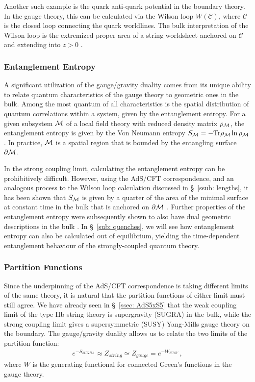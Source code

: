 \documentclass[../PhD.tex]{subfiles}
\begin{document}
Another such example is the quark anti-quark potential in the boundary theory. In the gauge theory, this can be calculated via the Wilson loop $W(\mathcal C)$, where $\mathcal C$ is the closed loop connecting the quark worldlines. The bulk interpretation of the Wilson loop is the extremized proper area of a string worldsheet anchored on $\mathcal C$ and extending into $z > 0$ \cite{hep-th/9803002}. 


\subsubsection*{Entanglement Entropy}
\label{ssub: EE}
A significant utilization of the gauge/gravity duality comes from its unique ability to relate quantum characteristics of the gauge theory to geometric ones in the bulk. Among the most quantum of all characteristics is the spatial distribution of quantum correlations within a system, given by the entanglement entropy. For a given subsystem $\mathcal M$ of a local field theory with reduced density matrix $\rho_{\mathcal M}$, the entanglement entropy is given by the Von Neumann entropy $S_{\mathcal M} = - \text{Tr} \rho_{\mathcal M} \ln \rho_{\mathcal M}$. In practice, $\mathcal M$ is a spatial region that is bounded by the entangling surface $\partial \mathcal M$.

In the strong coupling limit, calculating the entanglement entropy can be prohibitively difficult. However, using the AdS/CFT correspondence, and an analogous process to the Wilson loop calculation discussed in \S~\!\ref{ssub: lengths}, it has been shown that $S_{\mathcal M}$ is given by a quarter of the area of the minimal surface at constant time in the bulk that is anchored on $\partial \mathcal M$ \cite{hep-th/0603001}. Further properties of the entanglement entropy were subsequently shown to also have dual geometric descriptions in the bulk \cite{1304.4926}. In \S~\!\ref{sub: quenches}, we will see how entanglement entropy can also be calculated out of equilibrium, yielding the time-dependent entanglement behaviour of the strongly-coupled quantum theory.

\subsubsection*{Partition Functions}
\label{ssec: partitions}

Since the underpinning of the AdS/CFT correspondence is taking different limits of the same theory, it is natural that the partition functions of either limit must still agree. We have already seen in \S~\!\ref{ssec: AdS5xS5} that the weak coupling limit of the type IIb string theory is supergravity (SUGRA) in the bulk, while the strong coupling limit gives a supersymmetric (SUSY) Yang-Mills gauge theory on the boundary. The gauge/gravity duality allows us to relate the two limits of the partition function:
\begin{align}
\label{partition functions}
e^{-S_{SUGRA}} \approx Z_{string} \simeq Z_{gauge} = e^{-W_{SUSY}} \, ,
\end{align}
where $W$ is the generating functional for connected Green's functions in the gauge theory.
\end{document}
